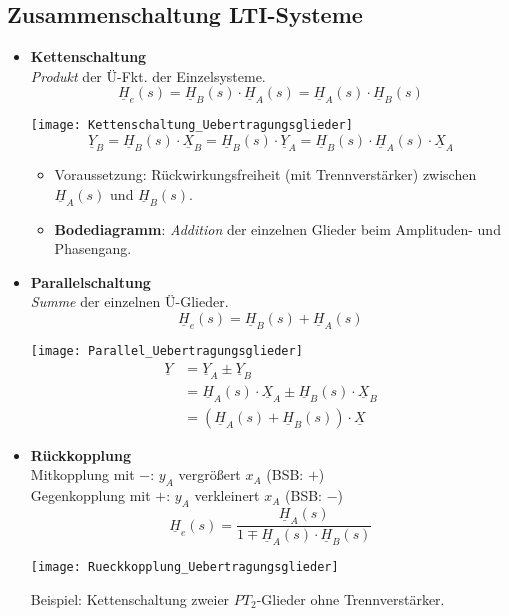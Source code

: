 \subsection{Zusammenschaltung LTI-Systeme}
\begin{itemize}
    \item \textbf{Kettenschaltung}\\
        \textit{Produkt} der Ü-Fkt. der Einzelsysteme.
        \[
            \boxed{\underline{H}_{e}(s)=\underline{H}_{B}(s) \cdot \underline{H}_{A}(s)=\underline{H}_{A}(s) \cdot \underline{H}_{B}(s)}
        \]
        \begin{center}
            \texttt{[image: Kettenschaltung\_Uebertragungsglieder]}
            \[
                \underline{Y}_{B}=\underline{H}_{B}(s) \cdot \underline{X}_{B}=\underline{H}_{B}(s) \cdot \underline{Y}_{A}=\underline{H}_{B}(s) \cdot \underline{H}_{A}(s) \cdot \underline{X}_{A}
            \]
        \end{center}
        \begin{itemize}
	        \item Voraussetzung: Rückwirkungsfreiheit (mit Trennverstärker) zwischen $\underline{H}_A(s)$ und $\underline{H}_B(s)$.
        	\item \textbf{Bodediagramm}: \textit{Addition} der einzelnen Glieder beim Amplituden- und Phasengang.
        \end{itemize}      
    \item \textbf{Parallelschaltung}\\
        \textit{Summe} der einzelnen Ü-Glieder.
        \[
            \boxed{\underline{H}_{e}(s)=\underline{H}_{B}(s) + \underline{H}_{A}(s)}
        \]
        \begin{center}
            \texttt{[image: Parallel\_Uebertragungsglieder]}
            \begin{align*}
                \underline{Y}&=\underline{Y}_{A} \pm \underline{Y}_{B}\\
                             &=\underline{H}_{A}(s) \cdot \underline{X}_{A} \pm \underline{H}_{B}(s) \cdot \underline{X}_{B}\\
                             &=\left(\underline{H}_{A}(s)+\underline{H}_{B}(s)\right) \cdot \underline{X}
            \end{align*}
        \end{center}
    \item \textbf{Rückkopplung}\\
    Mitkopplung mit $-$: $y_A$ vergrößert $x_A$ (BSB: $+$)\\
    Gegenkopplung mit $+$: $y_A$ verkleinert $x_A$ (BSB: $-$)
    \[
    \boxed{\underline{H}_{e}(s)=\frac{\underline{H}_{A}(s)}{1\mp\underline{H}_{A}(s) \cdot \underline{H}_{B}(s)}}
    \]
    \begin{center}
    	\texttt{[image: Rueckkopplung\_Uebertragungsglieder]}
    \end{center}
    Beispiel: Kettenschaltung zweier $PT_2$-Glieder ohne Trennverst\"arker.
    \end{itemize}
 
